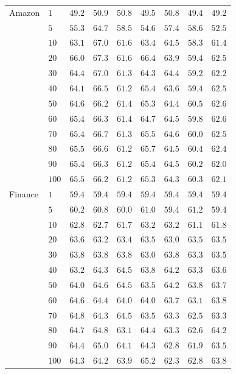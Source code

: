 \begin{table}[H]
\begin{tabular}{llccccccc}
\midrule
Amazon & $1$ & $49.2$ & $\mathbf{50.9}$ & $50.8$ & $49.5$ & $50.8$ & $49.4$ & $49.2$ \\
 & $5$ & $55.3$ & $\mathbf{64.7}$ & $58.5$ & $54.6$ & $57.4$ & $58.6$ & $52.5$ \\
 & $10$ & $63.1$ & $\mathbf{67.0}$ & $61.6$ & $63.4$ & $64.5$ & $58.3$ & $61.4$ \\
 & $20$ & $66.0$ & $\mathbf{67.3}$ & $61.6$ & $66.4$ & $63.9$ & $59.4$ & $62.5$ \\
 & $30$ & $64.4$ & $\mathbf{67.0}$ & $61.3$ & $64.3$ & $64.4$ & $59.2$ & $62.2$ \\
 & $40$ & $64.1$ & $\mathbf{66.5}$ & $61.2$ & $65.4$ & $63.6$ & $59.4$ & $62.5$ \\
 & $50$ & $64.6$ & $\mathbf{66.2}$ & $61.4$ & $65.3$ & $64.4$ & $60.5$ & $62.6$ \\
 & $60$ & $65.4$ & $\mathbf{66.3}$ & $61.4$ & $64.7$ & $64.5$ & $59.8$ & $62.6$ \\
 & $70$ & $65.4$ & $\mathbf{66.7}$ & $61.3$ & $65.5$ & $64.6$ & $60.0$ & $62.5$ \\
 & $80$ & $65.5$ & $\mathbf{66.6}$ & $61.2$ & $65.7$ & $64.5$ & $60.4$ & $62.4$ \\
 & $90$ & $65.4$ & $\mathbf{66.3}$ & $61.2$ & $65.4$ & $64.5$ & $60.2$ & $62.0$ \\
 & $100$ & $65.5$ & $\mathbf{66.2}$ & $61.2$ & $65.3$ & $64.3$ & $60.3$ & $62.1$ \\
\midrule
Finance & $1$ & $\mathbf{59.4}$ & $\mathbf{59.4}$ & $\mathbf{59.4}$ & $\mathbf{59.4}$ & $\mathbf{59.4}$ & $\mathbf{59.4}$ & $\mathbf{59.4}$ \\
 & $5$ & $60.2$ & $60.8$ & $60.0$ & $61.0$ & $59.4$ & $\mathbf{61.2}$ & $59.4$ \\
 & $10$ & $62.8$ & $62.7$ & $61.7$ & $\mathbf{63.2}$ & $\mathbf{63.2}$ & $61.1$ & $61.8$ \\
 & $20$ & $\mathbf{63.6}$ & $63.2$ & $63.4$ & $63.5$ & $63.0$ & $63.5$ & $63.5$ \\
 & $30$ & $\mathbf{63.8}$ & $\mathbf{63.8}$ & $\mathbf{63.8}$ & $63.0$ & $\mathbf{63.8}$ & $63.3$ & $63.5$ \\
 & $40$ & $63.2$ & $64.3$ & $\mathbf{64.5}$ & $63.8$ & $64.2$ & $63.3$ & $63.6$ \\
 & $50$ & $64.0$ & $\mathbf{64.6}$ & $64.5$ & $63.5$ & $64.2$ & $63.8$ & $63.7$ \\
 & $60$ & $\mathbf{64.6}$ & $64.4$ & $64.0$ & $64.0$ & $63.7$ & $63.1$ & $63.8$ \\
 & $70$ & $\mathbf{64.8}$ & $64.3$ & $64.5$ & $63.5$ & $63.3$ & $62.5$ & $63.3$ \\
 & $80$ & $64.7$ & $\mathbf{64.8}$ & $63.1$ & $64.4$ & $63.3$ & $62.6$ & $64.2$ \\
 & $90$ & $64.4$ & $\mathbf{65.0}$ & $64.1$ & $64.3$ & $62.8$ & $61.9$ & $63.5$ \\
 & $100$ & $64.3$ & $64.2$ & $63.9$ & $\mathbf{65.2}$ & $62.3$ & $62.8$ & $63.8$ \\
\bottomrule
\end{tabular}
\end{table}

